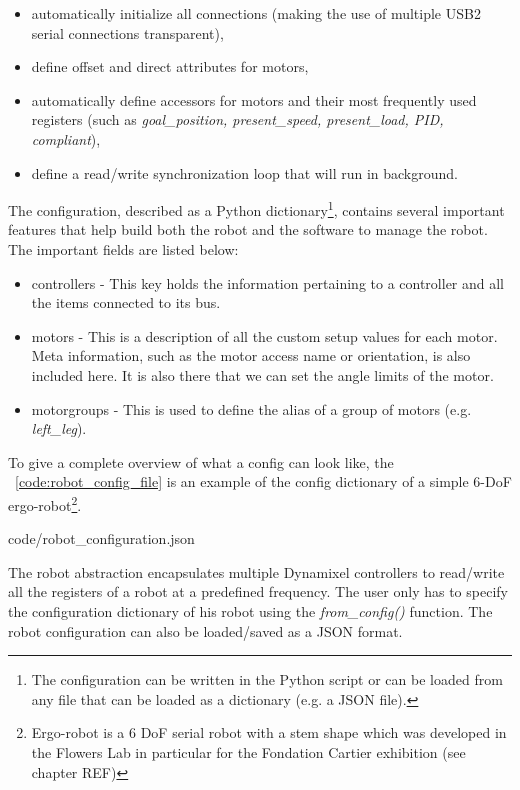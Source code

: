 \begin{itemize}
    \item automatically initialize all connections (making the use of multiple USB2 serial connections transparent),
    \item define offset and direct attributes for motors,
    \item automatically define accessors for motors and their most frequently used registers (such as \emph{goal\_position, present\_speed, present\_load, PID, compliant}),
    \item define a read/write synchronization loop that will run in background.
\end{itemize}

The configuration, described as a Python dictionary\footnote{The configuration can be written in the Python script or can be loaded from any file that can be loaded as a dictionary (e.g. a JSON file).}, contains several important features that help build both the robot and the software to manage the robot. The important fields are listed below:

\begin{itemize}
    \item controllers - This key holds the information pertaining to a controller and all the items connected to its bus.
    \item motors - This is a description of all the custom setup values for each motor. Meta information, such as the motor access name or orientation, is also included here. It is also there that we can set the angle limits of the motor.
    \item motorgroups - This is used to define the alias of a group of motors (e.g. \emph{left\_leg}).
\end{itemize}

To give a complete overview of what a config can look like, the \codename~\ref{code:robot_config_file} is an example of the config dictionary of a simple 6-DoF ergo-robot\footnote{Ergo-robot is a 6 DoF serial robot with a stem shape which was developed in the Flowers Lab in particular for the Fondation Cartier exhibition (see chapter REF)}.


    {code/robot_configuration.json}


The robot abstraction encapsulates multiple Dynamixel controllers to read/write all the registers of a robot at a predefined frequency. The user only has to specify the configuration dictionary of his robot using the \emph{from\_config()} function. The robot configuration can also be loaded/saved as a JSON format.

